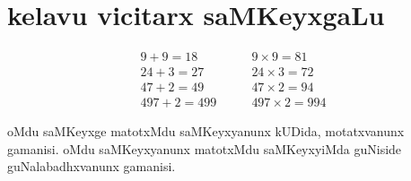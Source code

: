 \chapter{kelavu vicitarx saMKeyxgaLu}

$$
\begin{array}{cc}
9+9 = 18    &\qquad  9\times 9 =81\\
24+3 = 27   &\qquad  24\times 3 = 72 \\
47+2 =49    &\qquad  47\times 2 = 94 \\
497+2 = 499 &\qquad 497\times 2= 994
\end{array}
$$

\begin{multicols}{2}
oMdu saMKeyxge matotxMdu saMKeyxyanunx kUDida, motatxvanunx gamanisi.
\columnbreak
oMdu saMKeyxyanunx matotxMdu saMKeyxyiMda guNiside guNalabadhxvanunx gamanisi.
\end{multicols}

\
